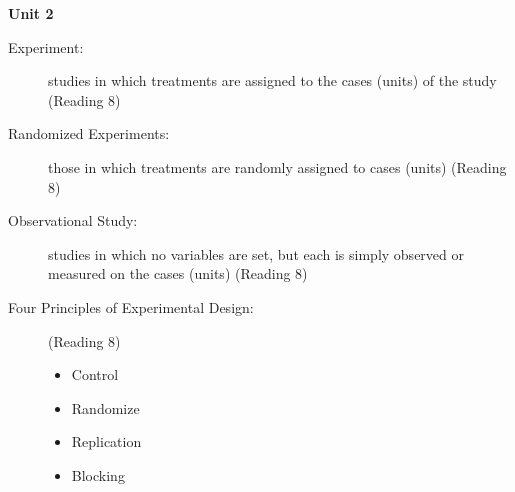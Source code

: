   \begin{center}
    {\large\bf Unit 2}
  \end{center}
  \begin{description}
  \item[Experiment:] studies in which treatments are assigned to the
  cases (units) of the study (Reading 8)
\item [Randomized Experiments:] those in which treatments are randomly
  assigned to cases (units) (Reading 8)
\item [Observational Study:] studies in which no variables are set,
  but each is simply observed or measured on the cases (units)
  (Reading 8)
\item [Four Principles of Experimental Design:] (Reading 8)
  \begin{itemize}
  \item Control
  \item Randomize
  \item Replication
  \item Blocking
  \end{itemize}


\end{description}
